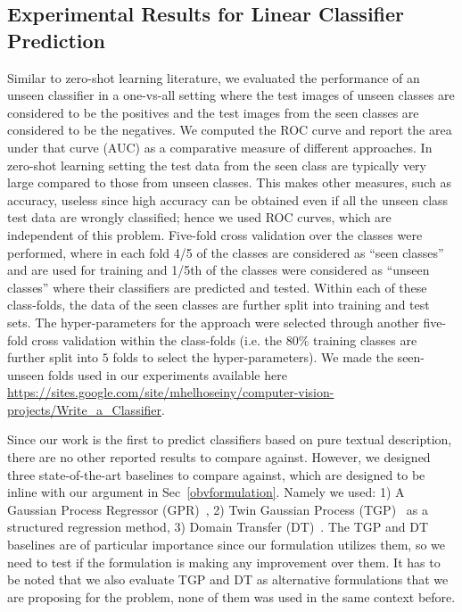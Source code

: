 \subsection{Experimental Results for Linear Classifier Prediction}


 Similar to zero-shot learning literature, we evaluated the performance of an unseen classifier in a one-vs-all setting where the test images of unseen classes are considered to be the positives and the test images from the seen classes are considered to be the negatives. We computed the ROC curve and report the area under that curve (AUC) as a comparative measure of different approaches. In zero-shot learning setting the test data from the seen class are typically very large compared to those from unseen classes. This makes other measures, such as accuracy, useless since high accuracy can be obtained even if all the unseen class test data are wrongly classified; hence we used ROC curves, which are independent of this problem. Five-fold cross validation over the classes were performed, where in each fold 4/5 of the classes are considered as ``seen classes'' and are used for training and 1/5th of the classes were considered as ``unseen classes'' where their classifiers are predicted and tested. Within each of these class-folds, the data of the seen classes are further split into training and test sets. The hyper-parameters for the  approach were selected through another five-fold cross validation within the class-folds  (i.e. the $80\%$ training classes are further split into $5$ folds to select the hyper-parameters). We made the seen-unseen folds used in our experiments available here \url{https://sites.google.com/site/mhelhoseiny/computer-vision-projects/Write_a_Classifier}.

Since our work is the first to predict classifiers based on pure textual description, there are no other reported results to compare against. However, we designed three state-of-the-art baselines to compare against, which are designed to be inline with our argument in Sec~\ref{obvformulation}. Namely we used: 1) A Gaussian Process Regressor (GPR)~\cite{Rasmussen:2005}, 2) Twin Gaussian Process (TGP)~\cite{Bo:2010} as a structured regression method, 3)  Domain Transfer (DT)~\cite{da11}. The TGP and DT baselines are of particular importance since our formulation utilizes them, so we need to test if the formulation is making any improvement over them. It has to be noted that we also evaluate TGP and DT as alternative formulations that we are proposing for the problem, none of them was used in the same context before. %

